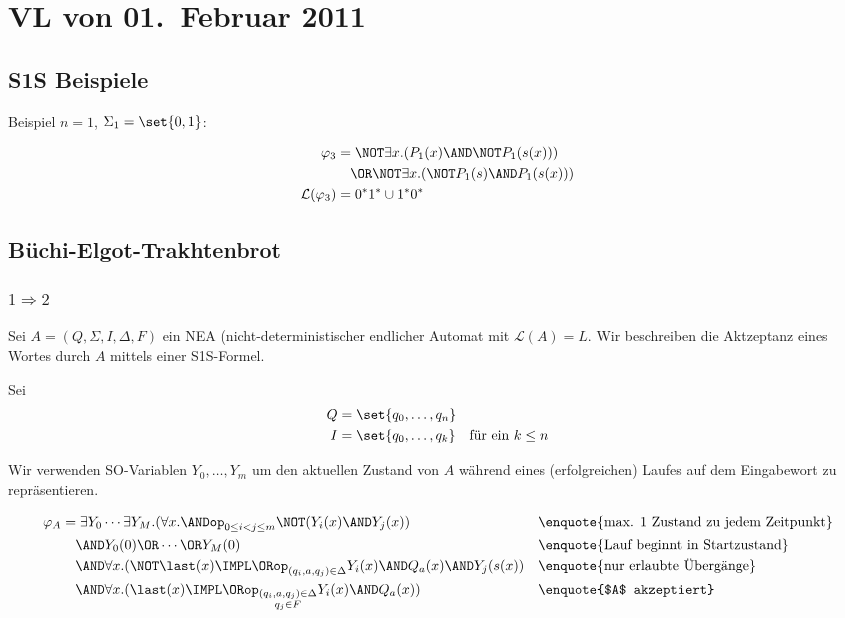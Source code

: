 \section{VL von 01.~Februar 2011}

\subsection{S1S Beispiele}

Beispiel $n=1$, $\Sigma_1=\set{0,1}$:

\begin{align*}
  \varphi_3 &= \NOT\exists x.(P_1(x)\AND\NOT P_1(s(x))) \\
    &\quad \OR \NOT\exists x.(\NOT P_1(s)\AND P_1(s(x))) \\
  \mathcal{L}(\varphi_3) &= 0^*1^* \cup 1^*0^* \\
\end{align*}

\subsection{Büchi-Elgot-Trakhtenbrot}

\subsubsection{$1\Rightarrow 2$}

Sei $A=(Q,\Sigma,I,\Delta,F)$ ein NEA (nicht-deterministischer endlicher
Automat mit $\mathcal{L}(A)=L$. Wir beschreiben die Aktzeptanz eines Wortes
durch $A$ mittels einer S1S-Formel.

Sei
\begin{align*}
  Q &= \set{q_0,\dots,q_n}\\
  I &= \set{q_0,\dots,q_k} \quad\text{für ein $k\leq n$}\\
\end{align*}

Wir verwenden SO-Variablen $Y_0,\dots,Y_m$ um den aktuellen Zustand von
$A$ während eines (erfolgreichen) Laufes auf dem Eingabewort zu
repräsentieren.

\begin{align*}
  \varphi_A &= \exists Y_0 \cdots \exists Y_M.(\forall x. \ANDop_{0\leq i<j\leq m} \NOT(Y_i(x)\AND Y_j(x)) && \text{\enquote{max. 1 Zustand zu jedem Zeitpunkt}} \\
    &\quad \AND Y_0(0)\OR\cdots\OR Y_M(0) && \text{\enquote{Lauf beginnt in Startzustand}} \\
    &\quad \AND \forall x.(\NOT\last(x) \IMPL \ORop_{(q_i,a,q_j)\in\Delta} Y_i(x) \AND Q_a(x) \AND Y_j(s(x)) && \text{\enquote{nur erlaubte Übergänge}} \\
    &\quad \AND \forall x.(\last(x)\IMPL\ORop_{\substack{(q_i,a,q_j)\in\Delta\\ q_j\in F}} Y_i(x)\AND Q_a(x)) && \text{\enquote{$A$ akzeptiert}}
\end{align*}

